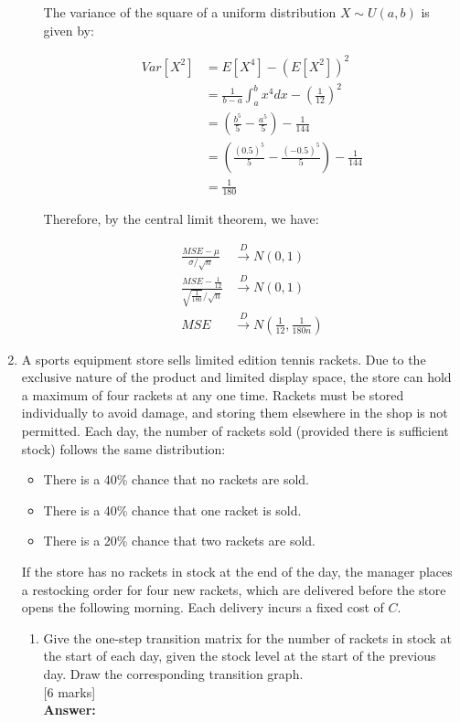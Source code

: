 \documentclass[12pt]{article}
\begin{document}
\begin{enumerate}
\begin{enumerate}
The variance of the square of a uniform distribution $X \sim U(a, b)$ is given by:

\begin{align*}
Var[X^2] &= E[X^4] - (E[X^2])^2 \\
&= \frac{1}{b-a} \int_a^b x^4 dx - \left(\frac{1}{12}\right)^2 \\
&= \left(\frac{b^5}{5} - \frac{a^5}{5}\right) - \frac{1}{144} \\
&= \left(\frac{(0.5)^5}{5} - \frac{(-0.5)^5}{5}\right) - \frac{1}{144} \\
&= \frac{1}{180}
\end{align*}

Therefore, by the central limit theorem, we have:

\begin{align*}
\frac{MSE - \mu}{\sigma/\sqrt{n}} &\xrightarrow{D} N(0, 1) \\
\frac{MSE - \frac{1}{12}}{\sqrt{\frac{1}{180}}/\sqrt{n}} &\xrightarrow{D} N(0, 1) \\
MSE &\xrightarrow{D} N\left(\frac{1}{12}, \frac{1}{180n}\right)
\end{align*}

\end{enumerate}

\vspace{5pt}
\item A sports equipment store sells limited edition tennis rackets. Due to the exclusive nature of the product and limited display space, the store can hold a maximum of four rackets at any one time. Rackets must be stored individually to avoid damage, and storing them elsewhere in the shop is not permitted.
%
Each day, the number of rackets sold (provided there is sufficient stock) follows the same distribution:
\begin{itemize}
	\item There is a 40\% chance that no rackets are sold.
	\item There is a 40\% chance that one racket is sold.
	\item There is a 20\% chance that two rackets are sold.
	\end{itemize}
%
If the store has no rackets in stock at the end of the day, the manager places a restocking order for four new rackets, which are delivered before the store opens the following morning. Each delivery incurs a fixed cost of $C$.  
%
\begin{enumerate}
\item Give the one-step transition matrix for the number of rackets in stock at the start of each day, given the stock level at the start of the previous day. Draw the corresponding transition graph. 
			\\\phantom{1}\hfill [6 marks]
%
\\
\textbf{Answer:}
\\

\end{enumerate}
\end{enumerate}
\end{document}
